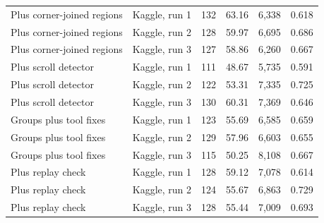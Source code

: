 \begin{table}[!htb]
\begin{tabular}{@{}llrrrr@{}}
Plus corner-joined regions & Kaggle, run 1 & 132 & 63.16 & 6,338 & 0.618 \\
Plus corner-joined regions & Kaggle, run 2 & 128 & 59.97 & 6,695 & 0.686 \\
Plus corner-joined regions & Kaggle, run 3 & 127 & 58.86 & 6,260 & 0.667 \\
Plus scroll detector & Kaggle, run 1 & 111 & 48.67 & 5,735 & 0.591 \\
Plus scroll detector & Kaggle, run 2 & 122 & 53.31 & 7,335 & 0.725 \\
Plus scroll detector & Kaggle, run 3 & 130 & 60.31 & 7,369 & 0.646 \\
Groups plus tool fixes & Kaggle, run 1 & 123 & 55.69 & 6,585 & 0.659 \\
Groups plus tool fixes & Kaggle, run 2 & 129 & 57.96 & 6,603 & 0.655 \\
Groups plus tool fixes & Kaggle, run 3 & 115 & 50.25 & 8,108 & 0.667 \\
Plus replay check & Kaggle, run 1 & 128 & 59.12 & 7,078 & 0.614 \\
Plus replay check & Kaggle, run 2 & 124 & 55.67 & 6,863 & 0.729 \\
Plus replay check & Kaggle, run 3 & 128 & 55.44 & 7,009 & 0.693 \\
\bottomrule
\end{tabular}
\end{table}

